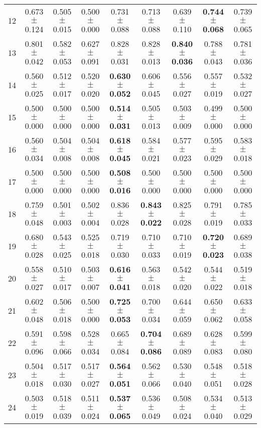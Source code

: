 \begin{table}[!ht]
{\begin{tabular}{r c c c c c c c c}
12 & 0.673 $\pm$ 0.124 & 0.505 $\pm$ 0.015 & 0.500 $\pm$ 0.000 & 0.731 $\pm$ 0.088 & 0.713 $\pm$ 0.088 & 0.639 $\pm$ 0.110 & \textbf{0.744 $\pm$ 0.068} & 0.739 $\pm$ 0.065 \\
13 & 0.801 $\pm$ 0.042 & 0.582 $\pm$ 0.053 & 0.627 $\pm$ 0.091 & 0.828 $\pm$ 0.031 & 0.828 $\pm$ 0.013 & \textbf{0.840 $\pm$ 0.036} & 0.788 $\pm$ 0.043 & 0.781 $\pm$ 0.036 \\
14 & 0.560 $\pm$ 0.025 & 0.512 $\pm$ 0.017 & 0.520 $\pm$ 0.020 & \textbf{0.630 $\pm$ 0.052} & 0.606 $\pm$ 0.045 & 0.556 $\pm$ 0.027 & 0.557 $\pm$ 0.019 & 0.532 $\pm$ 0.027 \\
15 & 0.500 $\pm$ 0.000 & 0.500 $\pm$ 0.000 & 0.500 $\pm$ 0.000 & \textbf{0.514 $\pm$ 0.031} & 0.505 $\pm$ 0.013 & 0.503 $\pm$ 0.009 & 0.499 $\pm$ 0.000 & 0.500 $\pm$ 0.000 \\
16 & 0.560 $\pm$ 0.034 & 0.504 $\pm$ 0.008 & 0.504 $\pm$ 0.008 & \textbf{0.618 $\pm$ 0.045} & 0.584 $\pm$ 0.021 & 0.577 $\pm$ 0.023 & 0.595 $\pm$ 0.029 & 0.583 $\pm$ 0.018 \\
17 & 0.500 $\pm$ 0.000 & 0.500 $\pm$ 0.000 & 0.500 $\pm$ 0.000 & \textbf{0.508 $\pm$ 0.016} & 0.500 $\pm$ 0.000 & 0.500 $\pm$ 0.000 & 0.500 $\pm$ 0.000 & 0.500 $\pm$ 0.000 \\
18 & 0.759 $\pm$ 0.048 & 0.501 $\pm$ 0.003 & 0.502 $\pm$ 0.004 & 0.836 $\pm$ 0.028 & \textbf{0.843 $\pm$ 0.022} & 0.825 $\pm$ 0.028 & 0.791 $\pm$ 0.019 & 0.785 $\pm$ 0.033 \\
19 & 0.680 $\pm$ 0.028 & 0.543 $\pm$ 0.025 & 0.525 $\pm$ 0.018 & 0.719 $\pm$ 0.030 & 0.710 $\pm$ 0.033 & 0.710 $\pm$ 0.019 & \textbf{0.720 $\pm$ 0.023} & 0.689 $\pm$ 0.038 \\
20 & 0.558 $\pm$ 0.027 & 0.510 $\pm$ 0.017 & 0.503 $\pm$ 0.007 & \textbf{0.616 $\pm$ 0.041} & 0.563 $\pm$ 0.018 & 0.542 $\pm$ 0.020 & 0.544 $\pm$ 0.022 & 0.519 $\pm$ 0.018 \\
21 & 0.602 $\pm$ 0.048 & 0.506 $\pm$ 0.018 & 0.500 $\pm$ 0.000 & \textbf{0.725 $\pm$ 0.053} & 0.700 $\pm$ 0.034 & 0.644 $\pm$ 0.059 & 0.650 $\pm$ 0.062 & 0.633 $\pm$ 0.058 \\
22 & 0.591 $\pm$ 0.096 & 0.598 $\pm$ 0.066 & 0.528 $\pm$ 0.034 & 0.665 $\pm$ 0.084 & \textbf{0.704 $\pm$ 0.086} & 0.689 $\pm$ 0.089 & 0.628 $\pm$ 0.083 & 0.599 $\pm$ 0.080 \\
23 & 0.504 $\pm$ 0.018 & 0.517 $\pm$ 0.030 & 0.517 $\pm$ 0.027 & \textbf{0.564 $\pm$ 0.051} & 0.562 $\pm$ 0.066 & 0.530 $\pm$ 0.040 & 0.548 $\pm$ 0.051 & 0.518 $\pm$ 0.028 \\
24 & 0.503 $\pm$ 0.019 & 0.518 $\pm$ 0.039 & 0.511 $\pm$ 0.024 & \textbf{0.537 $\pm$ 0.065} & 0.536 $\pm$ 0.049 & 0.508 $\pm$ 0.024 & 0.534 $\pm$ 0.040 & 0.513 $\pm$ 0.029 \\

\end{tabular}}
\end{table}
